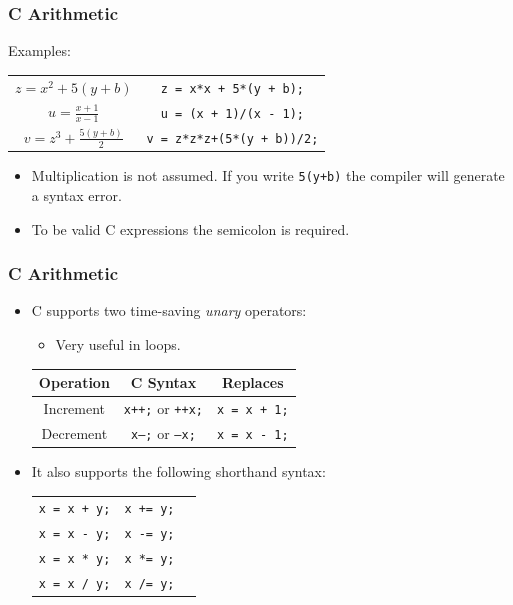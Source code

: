 \documentclass[14pt]{beamer}
\begin{document}
\begin{frame}
\frametitle{C Arithmetic}
Examples:
\begin{small}
\begin{table}
\centering
\begin{tabular}{cc}
\vspace{2mm}
$z = x^2 + 5(y + b)$ & \texttt{z = x*x + 5*(y + b);} \\
\vspace{2mm}
$u = \frac{x + 1}{x - 1}$ & \texttt{u = (x + 1)/(x - 1);} \\
$v = z^3 + \frac{5(y + b)}{2}$ & \texttt{v = z*z*z+(5*(y + b))/2;} \\
\end{tabular}
\end{table}
\end{small}

\begin{itemize}
\item Multiplication is not assumed. If you write \texttt{5(y+b)} the compiler will generate a syntax error.
\item To be valid C expressions the semicolon is required.
\end{itemize}
\end{frame}

\begin{frame}
\frametitle{C Arithmetic}
\begin{itemize}
\item C supports two time-saving \textit{unary} operators:
\begin{itemize}
\item Very useful in loops.
\end{itemize}

\begin{table}
\centering
\begin{tabular}{|c|c|c|}
\hline
Operation & C Syntax & Replaces\\
\hline
Increment & \texttt{x++;} or \texttt{++x;} & \texttt{x = x + 1;} \\
Decrement & \texttt{x--;} or \texttt{--x;} & \texttt{x = x - 1;} \\
\hline
\end{tabular}
\end{table}

\item It also supports the following shorthand syntax:

\begin{table}
\centering
\begin{tabular}{|c|c|c|}
\hline
\texttt{x = x + y;} & \texttt{x += y;} \\
\texttt{x = x - y;} & \texttt{x -= y;} \\
\texttt{x = x * y;} & \texttt{x *= y;} \\
\texttt{x = x / y;} & \texttt{x /= y;} \\
\hline
\end{tabular}
\end{table}
\end{itemize}
\end{frame}
\end{document}
